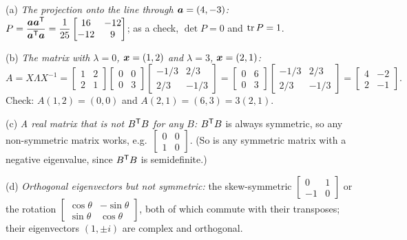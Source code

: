 \begin{example}\label{ex:u39-four}
(a) \emph{The projection onto the line through $\boldsymbol{a}=(4,-3)$:} $P=\dfrac{\boldsymbol{a}\boldsymbol{a}^{\mathsf{T}}}{\boldsymbol{a}^{\mathsf{T}}\boldsymbol{a}}=\dfrac{1}{25}\begin{bmatrix}16&-12\\-12&9\end{bmatrix}$; as a check, $\det P=0$ and $\operatorname{tr} P=1$.

(b) \emph{The matrix with $\lambda=0$, $\boldsymbol{x}=(1,2)$ and $\lambda=3$, $\boldsymbol{x}=(2,1)$:}
\[
A=X\Lambda X^{-1}=\begin{bmatrix}1&2\\2&1\end{bmatrix}\begin{bmatrix}0&0\\0&3\end{bmatrix}\begin{bmatrix}-1/3&2/3\\2/3&-1/3\end{bmatrix}=\begin{bmatrix}0&6\\0&3\end{bmatrix}\begin{bmatrix}-1/3&2/3\\2/3&-1/3\end{bmatrix}=\begin{bmatrix}4&-2\\2&-1\end{bmatrix}.
\]
Check: $A(1,2)=(0,0)$ and $A(2,1)=(6,3)=3(2,1)$.

(c) \emph{A real matrix that is not $B^{\mathsf{T}} B$ for any $B$:} $B^{\mathsf{T}} B$ is always symmetric, so any non-symmetric matrix works, e.g.\ $\begin{bmatrix}0&0\\1&0\end{bmatrix}$. (So is any symmetric matrix with a negative eigenvalue, since $B^{\mathsf{T}} B$ is semidefinite.)

(d) \emph{Orthogonal eigenvectors but not symmetric:} the skew-symmetric $\begin{bmatrix}0&1\\-1&0\end{bmatrix}$ or the rotation $\begin{bmatrix}\cos\theta&-\sin\theta\\\sin\theta&\cos\theta\end{bmatrix}$, both of which commute with their transposes; their eigenvectors $(1,\pm i)$ are complex and orthogonal.
\end{example}

